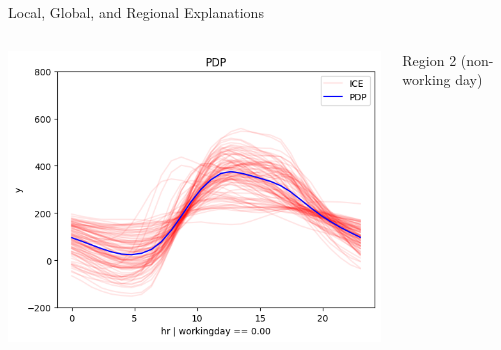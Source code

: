 \documentclass[11pt,compress,t,notes=noshow, aspectratio=169, xcolor=table]{beamer}
\begin{document}
\begin{frame}{Local, Global, and Regional Explanations}
{\begin{columns}[c, totalwidth=\textwidth]
    \begin{column}{0.37\textwidth}
\includegraphics[trim=0 0 0 20, clip, width=\textwidth]{figure/01_bike_sharing_dataset_28_0.png}
    \end{column}
    \begin{column}{0.125\textwidth}
    \centering
        \scriptsize Region 2 (non-working day)
    \end{column}
\end{columns}}
\end{frame}
\end{document}

